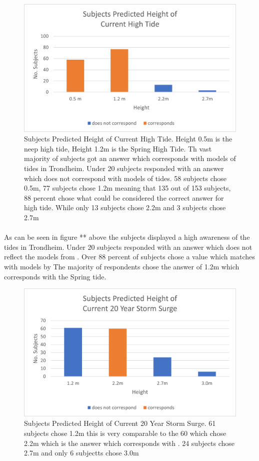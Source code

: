 \begin{figure}[h]
    \centering
    \includegraphics{fig_results/2022-hightide-answers.png}
    \caption{Subjects Predicted Height of Current High Tide. Height 0.5m is the neep high tide, Height 1.2m is the Spring High Tide. Th vast majority of subjects got an answer which corresponds with models of tides in Trondheim. Under 20 subjects responded with an answer which does not correspond with models of tides. 58 subjects chose 0.5m, 77 subjects chose 1.2m meaning that 135 out of 153 subjects, 88 percent chose what could be considered the correct answer for high tide. While only 13 subjects chose 2.2m and 3 subjects chose 2.7m}
    \label{fig:high-tide-answer}
\end{figure}
\paragraph{}
As can be seen in figure ** above the subjects displayed a high awareness of the tides in Trondheim. Under 20 subjects responded with an answer which does not reflect the models from \cite{kartverket_se_2021}. Over 88 percent of subjects chose a value which matches with models by \cite{kartverket_se_2021} The majority of respondents chose the answer of 1.2m which corresponds with the Spring tide. 

\begin{figure}[h]
    \centering
    \includegraphics{fig_results/2022-20yrss-answer.png}
    \caption{Subjects Predicted Height of Current 20 Year Storm Surge. 61 subjects chose 1.2m this is very comparable to the 60 which chose 2.2m which is the answer which corresponds with \cite{kartverket_se_2021}. 24 subjects chose 2.7m and only 6 subjectts chose 3.0m}
    \label{fig:2022-stormsurge-answers}
\end{figure}
